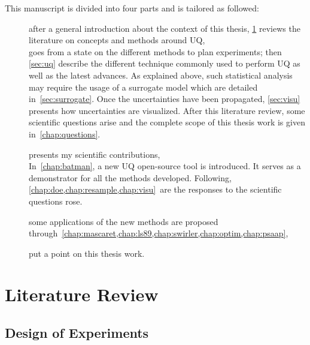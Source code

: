 This manuscript is divided into four parts and is tailored as followed: 

\begin{description}
	\item[] after a general introduction about the context of this thesis,  \cref{chap:review} reviews the literature on concepts and methods around UQ,\hfill\\
 goes from a state on the different methods to plan experiments; then \cref{sec:uq} describe the different technique commonly used to perform UQ as well as the latest advances. As explained above, such statistical analysis may require the usage of a surrogate model which are detailed in~\cref{sec:surrogate}. Once the uncertainties have been propagated, \cref{sec:visu} presents how uncertainties are visualized. After this literature review, some scientific questions arise and the complete scope of this thesis work is given in~\cref{chap:questions}.

	\item[] presents my scientific contributions,\hfill\\
In~\cref{chap:batman}, a new UQ open-source tool is introduced. It serves as a demonstrator for all the methods developed. Following, \cref{chap:doe,chap:resample,chap:visu}~are the responses to the scientific questions rose.

	\item[] some applications of the new methods are proposed through~\cref{chap:mascaret,chap:ls89,chap:swirler,chap:optim,chap:psaap},\hfill\\

	\item[] put a point on this thesis work.
\end{description}


\chapter{Literature Review}\label{chap:review}

\section{Design of Experiments}\label{sec:doe}

